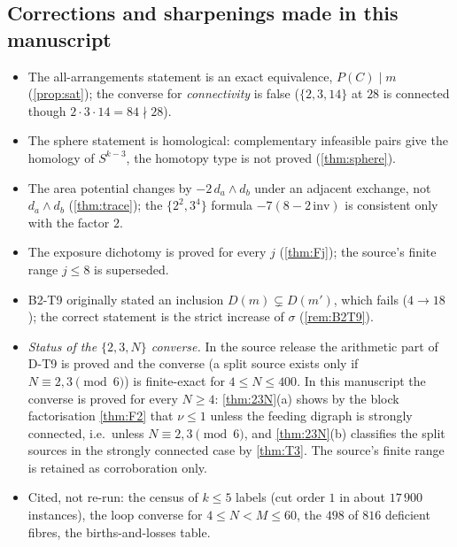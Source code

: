 \subsection{Corrections and sharpenings made in this manuscript}\label{sec:corrections}
\begin{itemize}[leftmargin=1.6em,itemsep=1pt]
\item The all-arrangements statement is an exact equivalence, $P(C)\mid m$ (\cref{prop:sat}); the converse for \emph{connectivity} is false ($\{2,3,14\}$ at $28$ is connected though $2\cdot3\cdot14=84\nmid28$).
\item The sphere statement is homological: complementary infeasible pairs give the homology of $S^{k-3}$, the homotopy type is not proved (\cref{thm:sphere}).
\item The area potential changes by $-2\,d_a\wedge d_b$ under an adjacent exchange, not $d_a\wedge d_b$ (\cref{thm:trace}); the $\{2^2,3^4\}$ formula $-7(8-2\,\mathrm{inv})$ is consistent only with the factor $2$.
\item The exposure dichotomy is proved for every $j$ (\cref{thm:Fj}); the source's finite range $j\le8$ is superseded.
\item B2-T9 originally stated an inclusion $D(m)\subsetneq D(m')$, which fails ($4\to18$); the correct statement is the strict increase of $\sigma$ (\cref{rem:B2T9}).
\item \emph{Status of the $\{2,3,N\}$ converse.} In the source release the arithmetic part of D-T9 is proved and the converse (a split source exists only if $N\equiv2,3\pmod6$) is finite-exact for $4\le N\le400$. In this manuscript the converse is proved for every $N\ge4$: \cref{thm:23N}(a) shows by the block factorisation \cref{thm:F2} that $\nu\le1$ unless the feeding digraph is strongly connected, i.e.\ unless $N\equiv2,3\pmod6$, and \cref{thm:23N}(b) classifies the split sources in the strongly connected case by \cref{thm:T3}. The source's finite range is retained as corroboration only.
\item Cited, not re-run: the census of $k\le5$ labels (cut order $1$ in about $17\,900$ instances), the loop converse for $4\le N<M\le60$, the $498$ of $816$ deficient fibres, the births-and-losses table.
\end{itemize}

